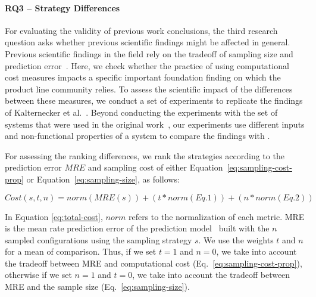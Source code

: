 \paragraph{RQ3 – Strategy Differences}
For evaluating the validity of previous work conclusions, the third research question asks whether previous scientific findings might be affected in general. 
Previous scientific findings in the field rely on the tradeoff of sampling size and prediction error~\cite{pereira2020, kaltenecker2019}.
Here, we check whether the practice of using computational cost measures impacts a specific important foundation finding on which the product line community relies. 
To assess the scientific impact of the differences between these measures, we conduct a set of experiments to replicate the findings of Kalternecker et al.~\cite{kaltenecker2019}. 
Beyond conducting the experiments with the set of systems that were used in the original work~\cite{kaltenecker2019}, our experiments use different inputs and non-functional properties of a system to compare the findings with \cite{pereira2020}.

For assessing the ranking differences, we rank the strategies according to the prediction error $MRE$ and sampling cost of either Equation~\ref{eq:sampling-cost-prop} or Equation~\ref{eq:sampling-size}, as follows:



\begin{equation}
    Cost(s, t, n) = norm(MRE(s)) + (t * norm({Eq. 1})) + (n * norm({Eq. 2}))
    \label{eq:total-cost}
\end{equation}

In Equation \ref{eq:total-cost}, $norm$ refers to the normalization of each metric. MRE is the mean rate prediction error of the prediction model~\cite{kaltenecker2019} built with the $n$ sampled configurations using the sampling strategy $s$. We use the weights $t$ and $n$ for a mean of comparison. Thus, if we set $t=1$ and $n=0$, we take into account the tradeoff between MRE and computational cost (Eq.~\ref{eq:sampling-cost-prop}), otherwise if we set $n=1$ and $t=0$, we take into account the tradeoff between MRE and the sample size (Eq.~\ref{eq:sampling-size}). 

